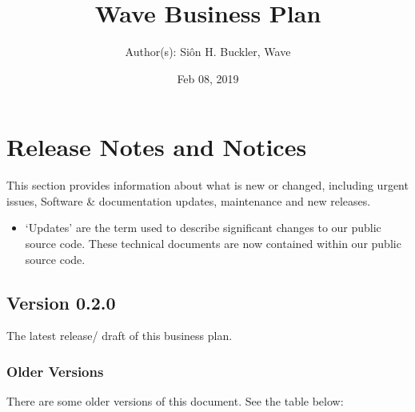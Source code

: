\documentclass[letterpaper,10pt,openany,oneside,english]{sphinxmanual}
\title{Wave Business Plan}
\date{Feb 08, 2019}
\author{Author(s): Siôn H. Buckler, Wave}
\begin{document}
\maketitle
\sphinxtableofcontents
{}\label{\detokenize{index::doc}}


\noindent{}


\chapter{Release Notes and Notices}
\label{\detokenize{releasenotes:release-notes-and-notices}}\label{\detokenize{releasenotes::doc}}
This section provides information about what is new or changed, including urgent issues, Software \& documentation updates, maintenance and new releases.
\begin{itemize}
\item {} 
‘Updates’ are the term used to describe significant changes to our public source code. These technical documents are now contained within our public source code.

\end{itemize}


\section{Version 0.2.0}
\label{\detokenize{releasenotes:version-0-2-0}}
The latest release/ draft of this business plan.


\subsection{Older Versions}
\label{\detokenize{releasenotes:older-versions}}
There are some older versions of this document. See the table below:
\end{document}
